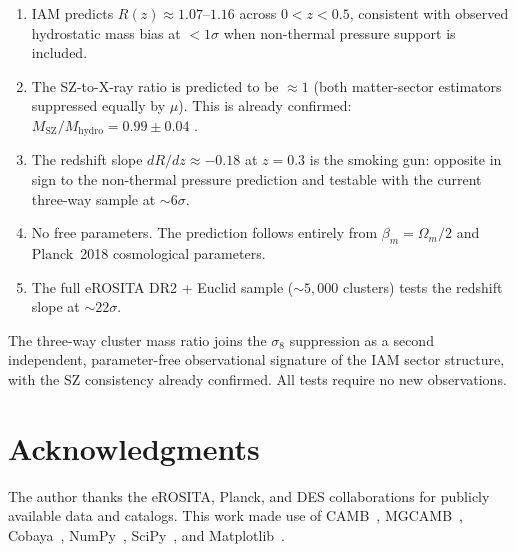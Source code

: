 \documentclass[12pt,a4paper]{article}
\begin{document}
\begin{enumerate}
\item IAM predicts $R(z) \approx 1.07\text{--}1.16$ across $0 < z < 0.5$, consistent
with observed hydrostatic mass bias at $< 1\sigma$ when non-thermal pressure
support is included.

\item The SZ-to-X-ray ratio is predicted to be $\approx 1$ (both matter-sector
estimators suppressed equally by $\mu$). This is already confirmed:
\mbox{$M_\mathrm{SZ}/M_\mathrm{hydro} = 0.99 \pm 0.04$} \citep{Bulbul2024}.

\item The redshift slope $dR/dz \approx -0.18$ at $z = 0.3$ is the smoking gun:
opposite in sign to the non-thermal pressure prediction and testable with the
current three-way sample at $\sim 6\sigma$.

\item No free parameters. The prediction follows entirely from
$\beta_m = \Omega_m/2$ and Planck~2018 cosmological parameters.

\item The full eROSITA DR2 + Euclid sample ($\sim 5{,}000$ clusters) tests the
redshift slope at $\sim 22\sigma$.
\end{enumerate}

The three-way cluster mass ratio joins the $\sigma_8$ suppression as a second
independent, parameter-free observational signature of the IAM sector structure,
with the SZ consistency already confirmed. All tests require no new observations.

\section*{Acknowledgments}

The author thanks the eROSITA, Planck, and DES collaborations for publicly
available data and catalogs. This work made use of CAMB~\citep{Lewis2000},
MGCAMB~\citep{Zucca2019}, Cobaya~\citep{Torrado2021}, NumPy~\citep{Harris2020},
SciPy~\citep{Virtanen2020}, and Matplotlib~\citep{Hunter2007}.
\end{document}
